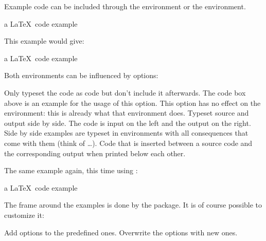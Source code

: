 \documentclass[load-preamble]{cnltx-doc}
\begin{document}
Example code can be included through the  environment or the
 environment.
\begin{sourcecode}
  \begin{example}
    a \LaTeX\ code example
  \end{example}
\end{sourcecode}
This example would give:

\begin{example}
  a \LaTeX\ code example
\end{example}

Both environments can be influenced by options:
\begin{options}
    Only typeset the code as code but don't include it afterwards.  The
    code box above is an example for the usage of this option.  This option
    has no effect on the  environment: this is already what
    that environment does.
    Typeset source and output side by side.  The code is input on the left and
    the output on the right.  Side by side examples are typeset in
     environments with all consequences that come with them
    (think of  \ldots).
    Code that is inserted between a source code and the corresponding output
    when printed below each other.
\end{options}

The same example again, this time using :

\begin{example}
  a \LaTeX\ code example
\end{example}

The frame around the examples is done by the  package.  It is of
course possible to customize it:
\begin{options}
  \Default
    Add options to the predefined ones.
    Overwrite the options with new ones.
\end{options}
\end{document}
